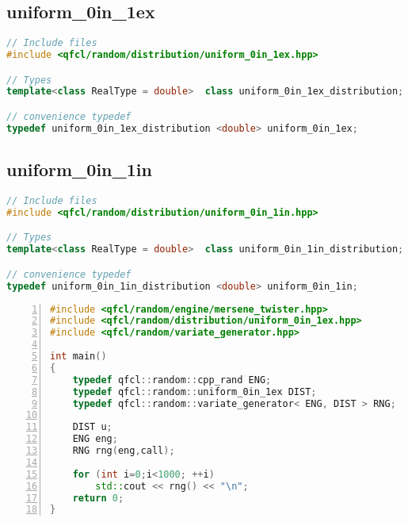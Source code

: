 %
\subsection{uniform\_0in\_1ex}
\begin{lstlisting}[language=C++]
// Include files
#include <qfcl/random/distribution/uniform_0in_1ex.hpp>

// Types
template<class RealType = double>  class uniform_0in_1ex_distribution;

// convenience typedef
typedef uniform_0in_1ex_distribution <double> uniform_0in_1ex;
\end{lstlisting}


%
\subsection{uniform\_0in\_1in}
\begin{lstlisting}[language=C++]
// Include files
#include <qfcl/random/distribution/uniform_0in_1in.hpp>

// Types
template<class RealType = double>  class uniform_0in_1in_distribution;

// convenience typedef
typedef uniform_0in_1in_distribution <double> uniform_0in_1in;
\end{lstlisting}











%
\begin{lstlisting}[language=C++,caption=Sample C++ code: function interface,numbers=left]
#include <qfcl/random/engine/mersene_twister.hpp>
#include <qfcl/random/distribution/uniform_0in_1ex.hpp>
#include <qfcl/random/variate_generator.hpp>

int main()
{
    typedef qfcl::random::cpp_rand ENG;
    typedef qfcl::random::uniform_0in_1ex DIST;
    typedef qfcl::random::variate_generator< ENG, DIST > RNG;
    
    DIST u;
    ENG eng;
    RNG rng(eng,call);
    
    for (int i=0;i<1000; ++i) 
    	std::cout << rng() << "\n";
    return 0;
}
\end{lstlisting}

